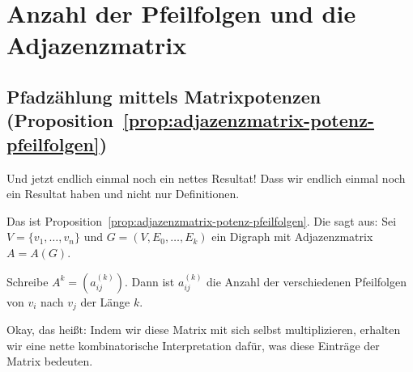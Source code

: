 \section{Anzahl der Pfeilfolgen und die Adjazenzmatrix}

\subsection{Pfadzählung mittels Matrixpotenzen (Proposition~\ref{prop:adjazenzmatrix-potenz-pfeilfolgen})}

\begin{spoken-clean}[01:08:48 - 01:11:54]
Und jetzt endlich einmal noch ein nettes Resultat! Dass wir endlich einmal noch ein Resultat haben und nicht nur Definitionen.

Das ist Proposition~\ref{prop:adjazenzmatrix-potenz-pfeilfolgen}. Die sagt aus: Sei $V = \{v_1, \dots, v_n\}$ und $G = (V, E_0, \dots, E_k)$ ein Digraph mit Adjazenzmatrix $A = A(G)$.

Schreibe $A^k = (a_{ij}^{(k)})$. Dann ist $a_{ij}^{(k)}$ die Anzahl der verschiedenen Pfeilfolgen von $v_i$ nach $v_j$ der Länge $k$.

Okay, das heißt: Indem wir diese Matrix mit sich selbst multiplizieren, erhalten wir eine nette kombinatorische Interpretation dafür, was diese Einträge der Matrix bedeuten.
\end{spoken-clean}

\begin{math-stroke}
\end{math-stroke}

